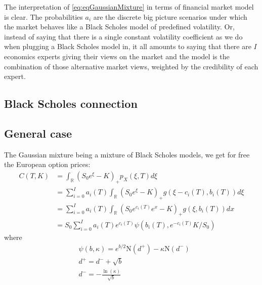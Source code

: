 \documentclass[10pt,a4paper]{article}
\begin{document}
The interpretation of \ref{eq:eqGaussianMixture} in terms of financial market model is clear. The probabilities $a_i$ are the discrete big picture scenarios under which the market behaves like a Black Scholes model of predefined volatility. Or, instead of saying that there is a single constant volatility coefficient as we do when plugging a Black Scholes model in, it all amounts to saying that there are $I$ economics experts giving their views on the market and the model is the combination of those alternative market views, weighted by the credibility of each expert.
\subsection{Black Scholes connection}
\subsection{General case}
The Gaussian mixture being a mixture of Black Scholes models, we get for free the European option prices:
\begin{align}\label{eq:CalibrationFormula}
C(T,K) &= \int_{\mathbb{R}} (S_0 e^\xi - K)_+ p_X(\xi,T)d\xi \\
&= \sum_{i=0}^{I}  a_i(T) \int_{\mathbb{R}} (S_0 e^\xi - K)_+ g(\xi-c_i(T),b_i(T))d\xi\\
&= \sum_{i=0}^{I}  a_i(T) \int_{\mathbb{R}} (S_0 e^{c_i(T)} e^x - K)_+ g(\xi,b_i(T))dx\\
& = S_0 \sum_{i=0}^{I}  a_i(T) e^{c_i(T)} \psi(b_i(T), e^{-c_i(T)} K/S_0)
\end{align}
where
\begin{align}
 &\psi(b,\kappa) = e^{b/2}\mathrm{N}(d^+) - \kappa \mathrm{N}(d^-)\\
  &d^+ = d^- + \sqrt{b} \\
  &d^-  = -\frac{\ln(\kappa)}{\sqrt{b}}
\end{align}
\end{document}
